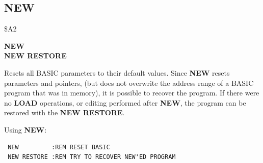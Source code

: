 
\newpage
\subsection{NEW}
\begin{description}[leftmargin=2cm,style=nextline]
\item [Token:] \$A2
\item [Format:] {\bf NEW} \\
                {\bf NEW RESTORE}
\item [Usage:]  Resets all BASIC parameters to their default values.
                Since {\bf NEW} resets parameters and pointers,
                (but does not overwrite the address
                range of a BASIC program that was in memory),
                it is possible to recover the
                program. If there were no {\bf LOAD} operations,
                or editing performed after {\bf NEW}, the program
                can be restored with the {\bf NEW RESTORE}.
\item [Examples:] Using {\bf NEW}:
\begin{tcolorbox}[colback=black,coltext=white]
\verbatimfont{\codefont}
\begin{verbatim}
 NEW         :REM RESET BASIC
 NEW RESTORE :REM TRY TO RECOVER NEW'ED PROGRAM
\end{verbatim}
\end{tcolorbox}
\end{description}


\newpage
